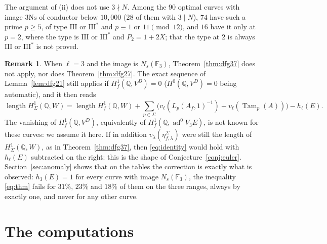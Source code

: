 \documentclass[11pt]{amsart}
\theoremstyle{definition}
\newtheorem{remark}[theorem]{Remark}
\newcommand{\Q}{\mathbb{Q}}
\newcommand{\F}{\mathbb{F}}
\newcommand{\ad}{\operatorname{ad}^0}
\newcommand{\Tam}{\operatorname{Tam}}
\newcommand{\len}{\operatorname{length}}
\newcommand{\Ns}{3\mathrm{Ns}}
\begin{document}
The argument of (ii) does not use $3\nmid N$. Among the $90$ optimal curves with image $\Ns$ of conductor below $10{,}000$ ($28$ of them with $3\mid N$), $74$ have such a prime $p\ge5$, of type $\mathrm{III}$ or $\mathrm{III}^*$ and $p\equiv1$ or $11\pmod{12}$, and $16$ have it only at $p=2$, where the type is $\mathrm{III}$ or $\mathrm{III}^*$ and $P_2=1+2X$; that the type at $2$ is always $\mathrm{III}$ or $\mathrm{III}^*$ is not proved.

\begin{remark}\label{rem:ns}
When $\ell=3$ and the image is $N_s(\F_3)$, Theorem~\ref{thm:dfg37} does not apply, nor does Theorem~\ref{thm:dfg27}. The exact sequence of Lemma~\ref{lem:dfg21} still applies if $H^1_f(\Q,V^D)=0$ ($H^0(\Q,V^D)=0$ being automatic), and it then reads
\[
\len H^1_\Sigma(\Q,W)=\len H^1_f(\Q,W)+\sum_{p\in\Sigma}\bigl(v_\ell(L_p(A_f,1)^{-1})+v_\ell(\Tam_p(A))\bigr)-h_\ell(E).
\]
The vanishing of $H^1_f(\Q,V^D)$, equivalently of $H^1_f(\Q,\ad V_3E)$, is not known for these curves: we assume it here. If in addition $v_\lambda(\eta^\Sigma_{f,\lambda})$ were still the length of $H^1_\Sigma(\Q,W)$, as in Theorem~\ref{thm:dfg37}, then \eqref{eq:identity} would hold with $h_\ell(E)$ subtracted on the right: this is the shape of Conjecture~\ref{conj:euler}. Section~\ref{sec:anomaly} shows that on the tables the correction is exactly what is observed: $h_3(E)=1$ for every curve with image $N_s(\F_3)$, the inequality \eqref{eq:thm} fails for $31\%$, $23\%$ and $18\%$ of them on the three ranges, always by exactly one, and never for any other curve.
\end{remark}

\section{The computations}\label{sec:data}
\end{document}

